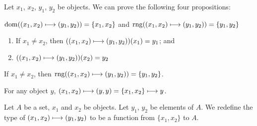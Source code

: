 \documentclass{article}
\begin{document}
Let $x_{1}$, $x_{2}$, $y_{1}$, $y_{2}$ be objects.
We can prove the following four propositions:
\begin{thm}
\item\label{funct4:62} $\operatorname{dom}((x_{1},x_{2})\longmapsto(y_{1},y_{2}))=\{x_{1},x_{2}\}$
  and $\operatorname{rng}((x_{1},x_{2})\longmapsto(y_{1},y_{2}))=\{y_{1},y_{2}\}$
\item\label{funct4:63}
  \begin{enumerate}[label=(\roman*)]
  \item If $x_{1}\neq x_{2}$, then $((x_{1},x_{2})\longmapsto(y_{1},y_{2}))(x_{1})=y_{1}$;
    and
  \item $((x_{1},x_{2})\longmapsto(y_{1},y_{2}))(x_{2})=y_{2}$
  \end{enumerate}
\item\label{funct4:64} If $x_{1}\neq x_{2}$,
  then $\operatorname{rng}((x_{1},x_{2})\longmapsto(y_{1},y_{2}))=\{y_{1},y_{2}\}$.
\item\label{funct4:65} For any object $y$,
  $(x_{1},x_{2})\longmapsto(y,y) = \{x_{1},x_{2}\}\longmapsto y$.
\end{thm}

\begin{definition}
Let $A$ be a set, $x_{1}$ and $x_{2}$ be objects. Let $y_{1}$, $y_{2}$
be elements of $A$.
We redefine the type of $(x_{1},x_{2})\longmapsto(y_{1},y_{2})$ to be a
function from $\{x_{1},x_{2}\}$ to $A$.
\end{definition}
\end{document}
